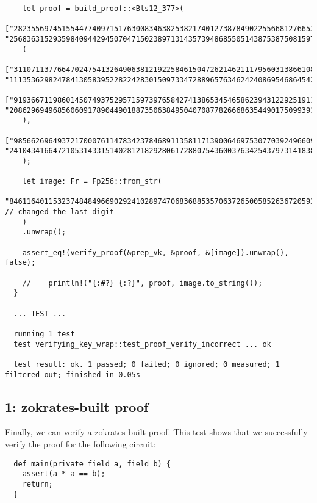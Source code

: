 \documentclass{article}
\begin{document}
\begin{lstlisting}
    let proof = build_proof::<Bls12_377>(
    ["2823556974515544774097151763008346382538217401273878490225566812766536738796196154138387932214916091703926798612", "256836315293598409442945070471502389713143573948685505143875387508159714195596227342715425692593966353228874272253"],
    (
    ["31107113776647024754132649063812192258461504726214621117956031386610890802548704229846887183629711420377939432119", "111353629824784130583952282242830150973347288965763462424086954686454292967282100836332310927094987906314221421873"],
    ["91936671198601450749375295715973976584274138653454658623943122925191168704925205918404144895071632258580325591842", "208629694968560609178904490188735063849504070877826668635449017509939169002653787652914605885048807640820436312893"]
    ),
    ["98566269649372170007611478342378468911358117139006469753077039249660968858754944774214496198826225135709632991983", "241043416647210531433151402812182928061728807543600376342543797314183884387241527972417219291397635999358690899902"]
    );

    let image: Fr = Fp256::from_str(
    "846116401153237484849669029241028974706836885357063726500585263672059318072", // changed the last digit
    )
    .unwrap();

    assert_eq!(verify_proof(&prep_vk, &proof, &[image]).unwrap(), false);

    //    println!("{:#?} {:?}", proof, image.to_string());
  }

  ... TEST ...

  running 1 test
  test verifying_key_wrap::test_proof_verify_incorrect ... ok

  test result: ok. 1 passed; 0 failed; 0 ignored; 0 measured; 1 filtered out; finished in 0.05s

\end{lstlisting}

\subsection{1: zokrates-built proof}
Finally, we can verify a zokrates-built proof. This test shows that we successfully verify the proof for the following circuit:

\begin{lstlisting}
  def main(private field a, field b) {
    assert(a * a == b);
    return;
  }
\end{lstlisting}
\end{document}
